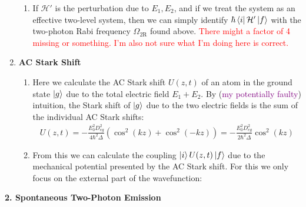 \documentclass{article}
\theoremstyle{definition}
\newcommand{\f}[2]{\frac{#1}{#2}}
\newcommand{\lp}{\left(}
\newcommand{\rp}{\right)}
\begin{document}
\begin{enumerate}
\begin{enumerate}[label=(\alph*)]
	\item If $\mathcal{H}'$ is the perturbation due to $E_1, E_2$, and if we treat the system as an effective two-level system, then we can simply identify $\hbar \bra{i}\mathcal{H}'\ket{f}$ with the two-photon Rabi frequency  $\Omega_\text{2R}$ found above. \textcolor{red}{There might a factor of 4 missing or something. I'm also not sure what I'm doing here is correct.}
	\end{enumerate}



	
	
	\item \textbf{AC Stark Shift}
	
	\begin{enumerate}[label=(\alph*)]
		\item Here we calculate the AC Stark shift $U(z,t)$ of an atom in the ground state $\ket{g}$ due to the total electric field $E_1 + E_2$. By (\textcolor{purple}{my potentially faulty}) intuition, the Stark shift of $\ket{g}$ due to the two electric fields is the sum of the individual AC Stark shifts:
		\begin{align*}
		U(z,t) = -\f{E_0^2 D_{eg}^2}{4\hbar^2\Delta }\lp \cos^2(kz) + \cos^2(-kz) \rp = -\f{E_0^2 D_{eg}^2}{2\hbar^2 \Delta} \cos^2(kz)
		\end{align*}
		
		\item From this we can calculate the coupling $\ket{i} U(z,t) \ket{f}$ due to the mechanical potential presented by the AC Stark shift. For this we only focus on the external part of the wavefunction:
		
		
	\end{enumerate}
	
\end{enumerate}


\noindent \textbf{2. Spontaneous Two-Photon Emission}
\end{document}
